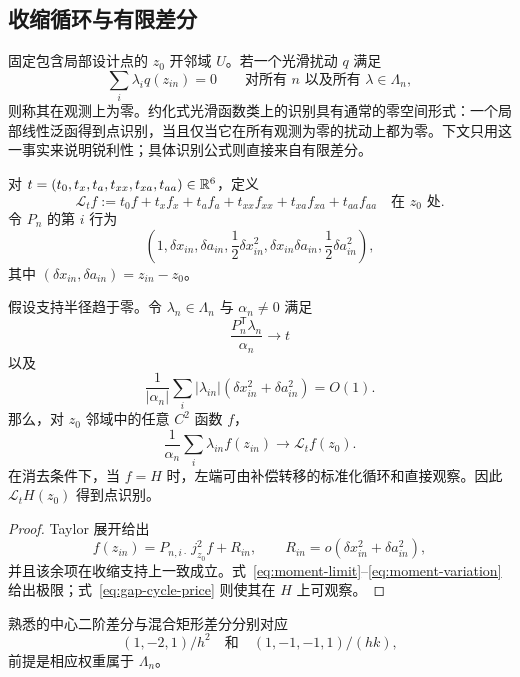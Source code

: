 \subsection{收缩循环与有限差分}
\label{sec:finite-differences}

固定包含局部设计点的 $z_0$ 开邻域 $U$。若一个光滑扰动 $q$ 满足
\begin{equation}
\sum_i\lambda_iq(z_{in})=0
\qquad
\text{对所有 }n\text{ 以及所有 }\lambda\in\Lambda_n,
\label{eq:null-perturbation}
\end{equation}
则称其在观测上为零。约化式光滑函数类上的识别具有通常的零空间形式：一个局部线性泛函得到点识别，当且仅当它在所有观测为零的扰动上都为零。下文只用这一事实来说明锐利性；具体识别公式则直接来自有限差分。

对 $t=(t_0,t_x,t_a,t_{xx},t_{xa},t_{aa})\in\mathbb R^6$，定义
\begin{equation}
\mathcal L_t f
:=
t_0f+t_xf_x+t_af_a+t_{xx}f_{xx}+t_{xa}f_{xa}+t_{aa}f_{aa}
\quad\text{在 }z_0\text{ 处}.
\label{eq:Lt-definition}
\end{equation}
令 $P_n$ 的第 $i$ 行为
\[
\left(
1,\delta x_{in},\delta a_{in},
\frac12\delta x_{in}^2,
\delta x_{in}\delta a_{in},
\frac12\delta a_{in}^2
\right),
\]
其中 $(\delta x_{in},\delta a_{in})=z_{in}-z_0$。

\begin{theorem}[收缩有限差分]
\label{thm:primitive-local}
假设支持半径趋于零。令 $\lambda_n\in\Lambda_n$ 与 $\alpha_n\ne0$ 满足
\begin{equation}
\frac{P_n^{\mathsf T}\lambda_n}{\alpha_n}\longrightarrow t
\label{eq:moment-limit}
\end{equation}
以及
\begin{equation}
\frac1{|\alpha_n|}\sum_i|\lambda_{in}|
(\delta x_{in}^2+\delta a_{in}^2)=O(1).
\label{eq:moment-variation}
\end{equation}
那么，对 $z_0$ 邻域中的任意 $C^2$ 函数 $f$，
\begin{equation}
\boxed{
\frac1{\alpha_n}\sum_i\lambda_{in}f(z_{in})
\longrightarrow \mathcal L_tf(z_0).}
\label{eq:cycle-moment-limit}
\end{equation}
在消去条件下，当 $f=H$ 时，左端可由补偿转移的标准化循环和直接观察。因此 $\mathcal L_tH(z_0)$ 得到点识别。
\end{theorem}

\begin{proof}
Taylor 展开给出
\[
f(z_{in})
=P_{n,i\cdot}\,j^2_{z_0}f+R_{in},
\qquad
R_{in}=o(\delta x_{in}^2+\delta a_{in}^2),
\]
并且该余项在收缩支持上一致成立。式~\eqref{eq:moment-limit}--\eqref{eq:moment-variation} 给出极限；式~\eqref{eq:gap-cycle-price} 则使其在 $H$ 上可观察。
\end{proof}

熟悉的中心二阶差分与混合矩形差分分别对应
\[
(1,-2,1)/h^2
\quad\text{和}\quad
(1,-1,-1,1)/(hk),
\]
前提是相应权重属于 $\Lambda_n$。
